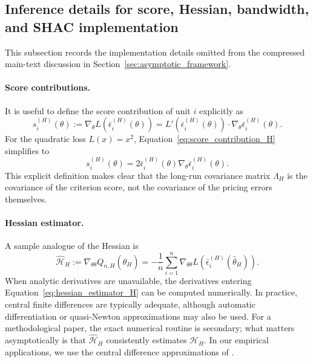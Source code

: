 \subsection{Inference details for score, Hessian, bandwidth, and SHAC implementation}

This subsection records the implementation details omitted from the compressed main-text discussion in Section~\ref{sec:asymptotic_framework}.

\paragraph{Score contributions.}

It is useful to define the score contribution of unit \(i\) explicitly as
\begin{equation}
	\label{eq:score_contribution_H}
	s_i^{(H)}(\theta)
	:=
	\nabla_\theta
	L\!\left(
	\bar{\epsilon}^{(H)}_i(\theta)
	\right)
	=
	L'\!\left(
	\bar{\epsilon}^{(H)}_i(\theta)
	\right)
	\cdot
	\nabla_\theta \bar{\epsilon}^{(H)}_i(\theta).
\end{equation}
For the quadratic loss \(L(x)=x^2\), Equation~\eqref{eq:score_contribution_H} simplifies to
\[
s_i^{(H)}(\theta)
=
2
\bar{\epsilon}^{(H)}_i(\theta)
\nabla_\theta \bar{\epsilon}^{(H)}_i(\theta).
\]
This explicit definition makes clear that the long-run covariance matrix \(\Lambda_H\) is the covariance of the criterion score, not the covariance of the pricing errors themselves.

\paragraph{Hessian estimator.}

A sample analogue of the Hessian is
\begin{equation}
	\label{eq:hessian_estimator_H}
	\hat{\mathcal{H}}_H
	:=
	\nabla_{\theta\theta} Q_{n,H}(\hat\theta_H)
	=
	-
	\frac{1}{n}
	\sum_{i=1}^n
	\nabla_{\theta\theta}
	L\!\left(
	\bar{\epsilon}^{(H)}_i(\hat\theta_H)
	\right).
\end{equation}
When analytic derivatives are unavailable, the derivatives entering Equation~\eqref{eq:hessian_estimator_H} can be computed numerically. In practice, central finite differences are typically adequate, although automatic differentiation or quasi-Newton approximations may also be used. For a methodological paper, the exact numerical routine is secondary; what matters asymptotically is that \(\hat{\mathcal{H}}_H\) consistently estimates \(\mathcal{H}_H\). In our empirical applications, we use the central difference approximations of \cite[Algorithm 2]{E17}.


